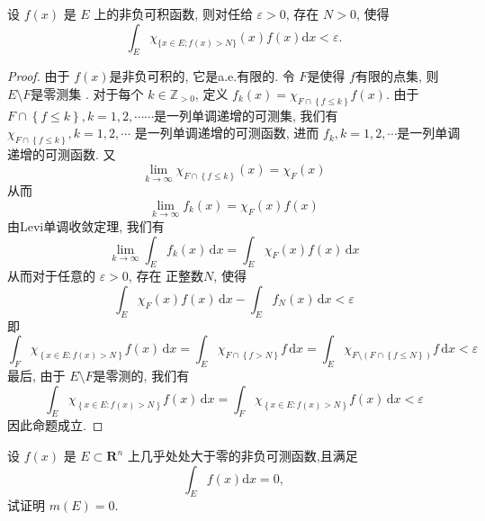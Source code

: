 \documentclass[../main.tex]{subfiles}
\begin{document}
 \begin{exercise}{}{}
设 $f(x)$ 是 $E$ 上的非负可积函数, 则对任给 $\varepsilon>0$, 存在 $N>0$,
使得
\[
\int_{E}\chi_{\{x \in E; f(x)>N\}}\left( x \right) f(x) \mathrm{d} x < \varepsilon.
\]
 \end{exercise}
\begin{proof}
    由于 \(  f\left( x \right)   \)是非负可积的, 它是a.e.有限的. 令 \(  F  \)是使得 \(  f  \)有限的点集, 则 \(  E\setminus F  \)是零测集 .  对于每个 \(  k \in \mathbb{Z} _{> 0}  \), 定义 \(  f_{k}\left( x \right)= \chi _{F\cap \left\{ f\le k \right\}}f\left( x \right)    \). 由于 \( F\cap  \left\{ f\le k \right\}, k= 1,2,\cdots \cdots   \)是一列单调递增的可测集, 我们有 \(  \chi _{F\cap \left\{ f\le k \right\}}, k= 1,2,\cdots   \)     是一列单调递增的可测函数, 进而 \(  f_{k},k= 1,2,\cdots   \)是一列单调递增的可测函数. 又  \[
    \lim_{k\to \infty}\chi _{F\cap \left\{ f\le k \right\}}\left( x \right) = \chi _{F}\left( x \right) 
    \]从而 \[
    \lim_{k\to \infty}f_{k}\left( x \right)= \chi _{F}\left( x \right)f\left( x \right)   
    \]由Levi单调收敛定理, 我们有 \[
    \lim_{k\to \infty}\int_{E}f_{k}\left( x \right)\,\mathrm{d} x=  \int_{E}\chi _{F}\left( x \right) f\left( x \right)\,\mathrm{d} x  
    \]从而对于任意的 \(   \varepsilon > 0  \), 存在 正整数\(  N  \), 使得 \[
    \int_{E}\chi _{F}\left( x \right)f\left( x \right)\,\mathrm{d} x-\int_{E}f_{N}\left( x \right)\,\mathrm{d} x<  \varepsilon    
    \]  即 \[
\int_{F}\chi _{\left\{ x\in E: f\left( x \right)> N  \right\}}f\left( x \right)\,\mathrm{d} x= \int_{E}\chi _{F\cap \left\{ f> N \right\}}f\,\mathrm{d} x= \int_{E}\chi _{F\setminus \left( F\cap \left\{ f\le N \right\} \right) }f\,\mathrm{d} x<  \varepsilon  
    \]最后, 由于 \(  E\setminus F  \)是零测的, 我们有 \[
\int_{E}\chi _{\left\{ x\in E: f\left( x \right)> N  \right\}}f\left( x \right)\,\mathrm{d} x= \int_{F} \chi _{\left\{ x\in E:f\left( x \right)> N  \right\}}f\left( x \right)\,\mathrm{d} x<  \varepsilon  
\] 因此命题成立.
\end{proof}
 \begin{exercise}{}{}
设 $f(x)$ 是 $E \subset \mathbf{R}^n$ 上几乎处处大于零的非负可测函数,且满足
\[
\int_E f(x) \mathrm{d}x = 0,
\]
试证明 $m(E) = 0$.
\end{exercise}
\end{document}

